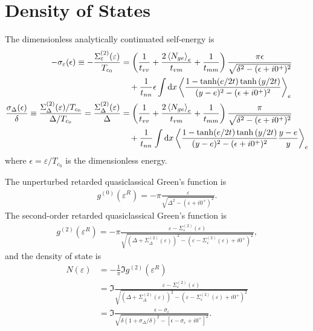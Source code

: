 \documentclass[aps,prl,preprint]{revtex4-2}
\begin{document}
\section{Density of States}

The dimensionless analytically continuated self-energy is
\begin{align}
    - \sigma_\varepsilon(\epsilon) \equiv -\frac{\Sigma^{(2)}_\varepsilon(\varepsilon)}{T_{c_0}}
     & = \left(\frac{1}{t_{vv}} + \frac{2\ev{N_{ge}}_e}{t_{vm}} + \frac{1}{t_{mm}}\right)\frac{\pi\epsilon}{\sqrt{\delta^2 - (\epsilon+i0^+)^2}} \nonumber \\
     & \quad + \frac{1}{t_{nn}}\epsilon\int\dd x\ev{\frac{1-\tanh(e/2t)\tanh{(y/2t)}}{(y-e)^2 - (\epsilon+i0^+)^2}}_e \nonumber                            \\
    \frac{\sigma_\Delta(\epsilon)}{\delta} \equiv \frac{\Sigma^{(2)}_\Delta(\varepsilon)/T_{c_0}}{\Delta/T_{c_0}}
    = \frac{\Sigma^{(2)}_\Delta(\varepsilon)}{\Delta}
     & = \left(\frac{1}{t_{vv}} + \frac{2\ev{N_{ge}}_e}{t_{vm}} + \frac{1}{t_{mm}}\right)\frac{\pi}{\sqrt{\delta^2 - (\epsilon+i0^+)^2}} \nonumber         \\
     & \quad + \frac{1}{t_{nn}}\int\dd x\ev{\frac{1-\tanh(e/2t)\tanh{(y/2t)}}{(y-e)^2 - (\epsilon+i0^+)^2}\frac{y-e}{y}}_e \nonumber                       \\
\end{align}
where $\epsilon = \varepsilon / T_{c_0}$ is the dimensionless energy.

The unperturbed retarded quasiclassical Green's function is
\begin{align}
    g^{(0)}(\varepsilon^R)
    = -\pi\frac{\varepsilon}
    {\sqrt{\Delta^2 - (\varepsilon+i0^+)^2}}.
\end{align}
The second-order retarded quasiclassical Green's function is
\begin{align}
    g^{(2)}(\varepsilon^R)
    = -\pi\frac{\varepsilon - \Sigma^{(2)}_\varepsilon(\varepsilon)}
    {\sqrt{(\Delta + \Sigma^{(2)}_\Delta(\varepsilon))^2
            - (\varepsilon - \Sigma^{(2)}_\varepsilon(\varepsilon) + i0^+)^2}},
\end{align}
and the density of state is
\begin{align}
    N(\varepsilon)
     & = -\frac{1}{\pi}\Im{g^{(2)}(\varepsilon^R)}                                                                                                                                              \\
     & = \Im{\frac{\varepsilon - \Sigma^{(2)}_\varepsilon(\varepsilon)}{\sqrt{(\Delta + \Sigma^{(2)}_\Delta(\varepsilon))^2 - (\varepsilon - \Sigma^{(2)}_\varepsilon(\varepsilon) + i0^+)^2}}} \\
     & = \Im{\frac{\epsilon-\sigma_\varepsilon}{\sqrt{\delta(1+\sigma_\Delta/\delta)^2 - [\epsilon-\sigma_\varepsilon + i0^+]^2}}}.
\end{align}
\end{document}
